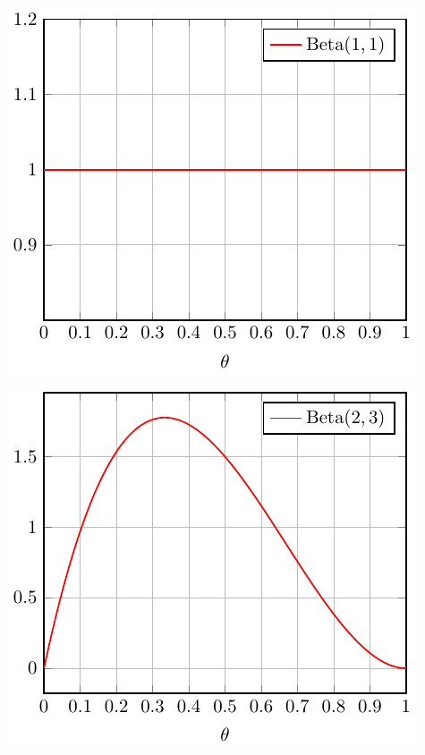 \begin{minipage}{0.5\textwidth}
  \includegraphics{Figures/Beta_1_1.pdf}
\end{minipage}
\begin{minipage}{0.5\textwidth}
  \includegraphics{Figures/Beta_2_3.pdf}
\end{minipage}
